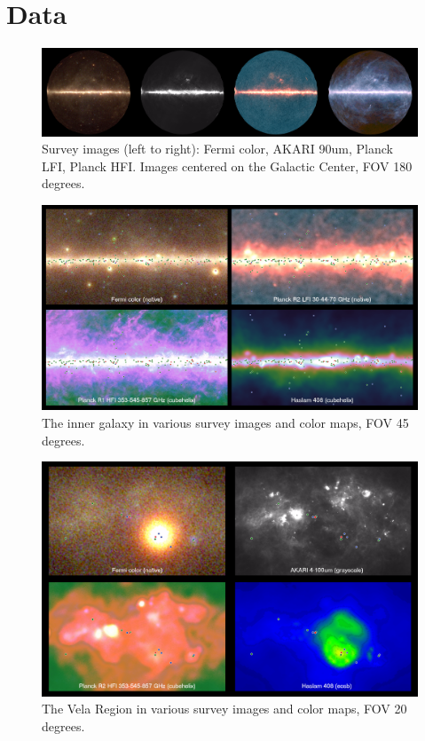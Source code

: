 \renewcommand{\thefootnote}{\arabic{footnote}}

\section{Data}

\begin{figure}[tb]
  \centerline{\includegraphics[width=\textwidth]{figures/four_images}}
  \caption{Survey images (left to right): Fermi color, AKARI 90um, Planck LFI, Planck HFI. Images centered on the Galactic Center, FOV 180 degrees.}
  \label{fig:four_images}
\end{figure}

\begin{figure}[tb]
  \centerline{\includegraphics[width=\textwidth]{figures/inner_galaxy_region}}
  \caption{The inner galaxy in various survey images and color maps, FOV 45 degrees.}
\end{figure}

\begin{figure}[tb]
  \centerline{\includegraphics[width=\textwidth]{figures/vela_region}}
  \caption{The Vela Region in various survey images and color maps, FOV 20 degrees.}
  \label{fig:vela_region}
\end{figure}


